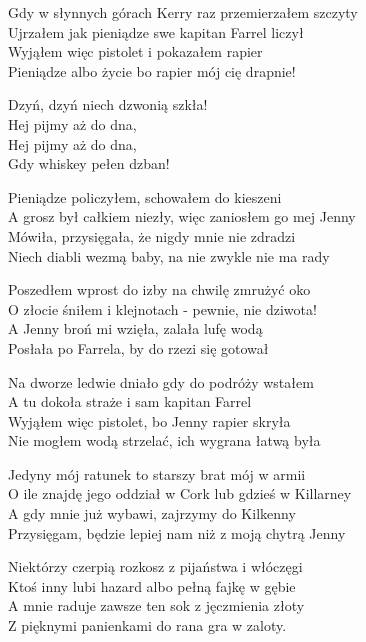\begin{text}
    Gdy w słynnych górach Kerry raz przemierzałem szczyty\\
    Ujrzałem jak pieniądze swe kapitan Farrel liczył\\
    Wyjąłem więc pistolet i pokazałem rapier\\
    Pieniądze albo życie bo rapier mój cię drapnie!

    \vin Dzyń, dzyń niech dzwonią szkła!\\
    \vin Hej pijmy aż do dna,\\
	\vin Hej pijmy aż do dna,\\
    \vin Gdy whiskey pełen dzban!

    Pieniądze policzyłem, schowałem do kieszeni\\
    A grosz był całkiem niezły, więc zaniosłem go mej Jenny\\
    Mówiła, przysięgała, że nigdy mnie nie zdradzi\\
    Niech diabli wezmą baby, na nie zwykle nie ma rady

    Poszedłem wprost do izby na chwilę zmrużyć oko\\
    O złocie śniłem i klejnotach - pewnie, nie dziwota!\\
    A Jenny broń mi wzięła, zalała lufę wodą\\
    Posłała po Farrela, by do rzezi się gotował

    Na dworze ledwie dniało gdy do podróży wstałem\\
    A tu dokoła straże i sam kapitan Farrel\\
    Wyjąłem więc pistolet, bo Jenny rapier skryła\\
    Nie mogłem wodą strzelać, ich wygrana łatwą była

    Jedyny mój ratunek to starszy brat mój w armii\\
    O ile znajdę jego oddział w Cork lub gdzieś w Killarney\\
    A gdy mnie już wybawi, zajrzymy do Kilkenny\\
    Przysięgam, będzie lepiej nam niż z moją chytrą Jenny

    Niektórzy czerpią rozkosz z pijaństwa i włóczęgi\\
    Ktoś inny lubi hazard albo pełną fajkę w gębie\\
    A mnie raduje zawsze ten sok z jęczmienia złoty\\
    Z pięknymi panienkami do rana gra w zaloty.

\end{text}

